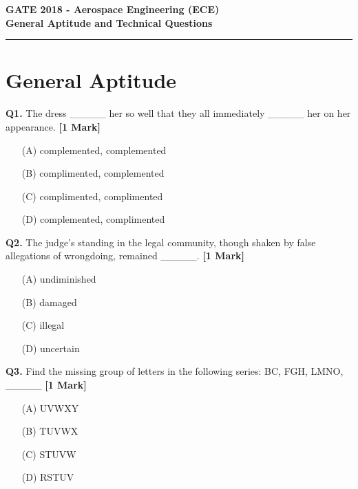 \documentclass[11pt]{article}
\newcommand{\questiona}[2]{
    \noindent\textbf{Q#2.} #1 \hfill \textbf{[1 Mark]}
}
\begin{document}
\begin{center}
    \Large\textbf{GATE 2018 - Aerospace Engineering (ECE)} \\
    \large\textbf{General Aptitude and Technical Questions} \\
    \rule{\textwidth}{0.5pt} %
\end{center}

\vspace{0.5cm}

\section*{General Aptitude}

\questiona{The dress \_\_\_\_\_ her so well that they all immediately \_\_\_\_\_ her on her appearance.}{1}
\begin{enumerate}
    \item[(A)] complemented, complemented  
    \item[(B)] complimented, complemented  
    \item[(C)] complimented, complimented  
    \item[(D)] complemented, complimented  
\end{enumerate}

\vspace{0.5cm}

\questiona{The judge’s standing in the legal community, though shaken by false allegations of wrongdoing, remained \_\_\_\_\_.}{2}
\begin{enumerate}
    \item[(A)] undiminished  
    \item[(B)] damaged  
    \item[(C)] illegal  
    \item[(D)] uncertain  
\end{enumerate}

\vspace{0.5cm}

\questiona{Find the missing group of letters in the following series: BC, FGH, LMNO, \_\_\_\_\_}{3}
\begin{enumerate}
    \item[(A)] UVWXY  
    \item[(B)] TUVWX  
    \item[(C)] STUVW  
    \item[(D)] RSTUV  
\end{enumerate}
\end{document}
